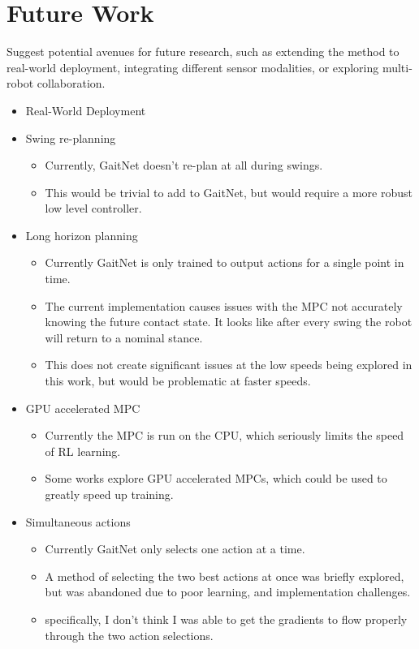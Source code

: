 \section{Future Work}

\begin{outline}
  Suggest potential avenues for future research, such as extending
  the method to real-world deployment, integrating different sensor
  modalities, or exploring multi-robot collaboration.
\end{outline}

\begin{itemize}
  \item Real-World Deployment

  \item Swing re-planning
    \begin{itemize}
      \item Currently, GaitNet doesn't re-plan at all during swings.
      \item This would be trivial to add to GaitNet, but would require
        a more robust low level controller.
    \end{itemize}

  \item Long horizon planning
    \begin{itemize}
      \item Currently GaitNet is only trained to output actions
        for a single point in time.
      \item The current implementation causes issues with the MPC
        not accurately knowing the future contact state. It looks
        like after every swing the robot will return to a nominal stance.
      \item This does not create significant issues at the low speeds
        being explored in this work, but would be problematic at faster speeds.
    \end{itemize}

  \item GPU accelerated MPC
    \begin{itemize}
      \item Currently the MPC is run on the CPU, which seriously limits
        the speed of RL learning.
      \item Some works explore GPU accelerated MPCs, which could be used
        to greatly speed up training.
    \end{itemize}

  \item Simultaneous actions
    \begin{itemize}
      \item Currently GaitNet only selects one action at a time.
      \item A method of selecting the two best actions at once was
        briefly explored, but was abandoned due to poor learning,
        and implementation challenges.
      \item specifically, I don't think I was able to get the gradients
        to flow properly through the two action selections.
    \end{itemize}


\end{itemize}
